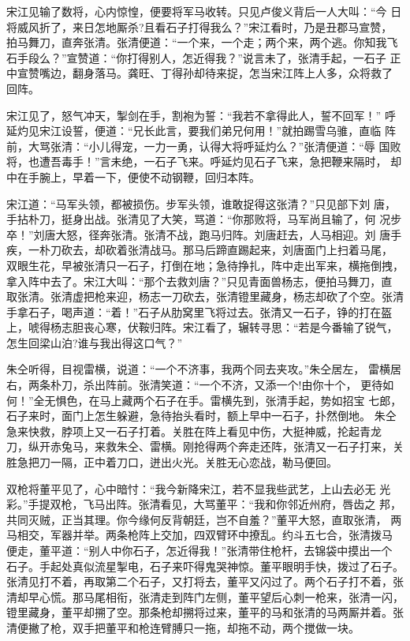宋江见输了数将，心内惊惶，便要将军马收转。只见卢俊义背后一人大叫：“今
日将威风折了，来日怎地厮杀?且看石子打得我么？”宋江看时，乃是丑郡马宣赞，
拍马舞刀，直奔张清。张清便道：“一个来，一个走；两个来，两个逃。你知我飞
石手段么？”宣赞道：“你打得别人，怎近得我？”说言未了，张清手起，一石子
正中宣赞嘴边，翻身落马。龚旺、丁得孙却待来捉，怎当宋江阵上人多，众将救了
回阵。

宋江见了，怒气冲天，掣剑在手，割袍为誓：“我若不拿得此人，誓不回军！”
呼延灼见宋江设誓，便道：“兄长此言，要我们弟兄何用！”就拍踢雪乌骓，直临
阵前，大骂张清：“小儿得宠，一力一勇，认得大将呼延灼么？”张清便道：“辱
国败将，也遭吾毒手！”言未绝，一石子飞来。呼延灼见石子飞来，急把鞭来隔时，
却中在手腕上，早着一下，便使不动钢鞭，回归本阵。

宋江道：“马军头领，都被损伤。步军头领，谁敢捉得这张清？”只见部下刘
唐，手拈朴刀，挺身出战。张清见了大笑，骂道：“你那败将，马军尚且输了，何
况步卒！”刘唐大怒，径奔张清。张清不战，跑马归阵。刘唐赶去，人马相迎。刘
唐手疾，一朴刀砍去，却砍着张清战马。那马后蹄直踢起来，刘唐面门上扫着马尾，
双眼生花，早被张清只一石子，打倒在地；急待挣扎，阵中走出军来，横拖倒拽，
拿入阵中去了。宋江大叫：“那个去救刘唐？”只见青面兽杨志，便拍马舞刀，直
取张清。张清虚把枪来迎，杨志一刀砍去，张清镫里藏身，杨志却砍了个空。张清
手拿石子，喝声道：“着！”石子从肋窝里飞将过去。张清又一石子，铮的打在盔
上，唬得杨志胆丧心寒，伏鞍归阵。宋江看了，辗转寻思：“若是今番输了锐气，
怎生回梁山泊?谁与我出得这口气？”

朱仝听得，目视雷横，说道：“一个不济事，我两个同去夹攻。”朱仝居左，
雷横居右，两条朴刀，杀出阵前。张清笑道：“一个不济，又添一个!由你十个，
更待如何！”全无惧色，在马上藏两个石子在手。雷横先到，张清手起，势如招宝
七郎，石子来时，面门上怎生躲避，急待抬头看时，额上早中一石子，扑然倒地。
朱仝急来快救，脖项上又一石子打着。关胜在阵上看见中伤，大挺神威，抡起青龙
刀，纵开赤兔马，来救朱仝、雷横。刚抢得两个奔走还阵，张清又一石子打来，关
胜急把刀一隔，正中着刀口，迸出火光。关胜无心恋战，勒马便回。

双枪将董平见了，心中暗忖：“我今新降宋江，若不显我些武艺，上山去必无
光彩。”手提双枪，飞马出阵。张清看见，大骂董平：“我和你邻近州府，唇齿之
邦，共同灭贼，正当其理。你今缘何反背朝廷，岂不自羞？”董平大怒，直取张清，
两马相交，军器并举。两条枪阵上交加，四双臂环中撩乱。约斗五七合，张清拨马
便走，董平道：“别人中你石子，怎近得我！”张清带住枪杆，去锦袋中摸出一个
石子。手起处真似流星掣电，石子来吓得鬼哭神惊。董平眼明手快，拨过了石子。
张清见打不着，再取第二个石子，又打将去，董平又闪过了。两个石子打不着，张
清却早心慌。那马尾相衔，张清走到阵门左侧，董平望后心刺一枪来，张清一闪，
镫里藏身，董平却搠了空。那条枪却搠将过来，董平的马和张清的马两厮并着。张
清便撇了枪，双手把董平和枪连臂膊只一拖，却拖不动，两个搅做一块。

